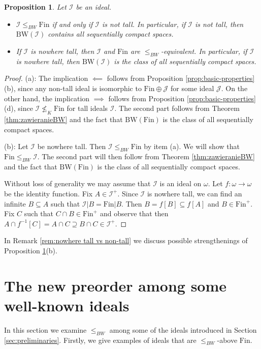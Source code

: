 \documentclass{amsart}
\theoremstyle{plain}
\newtheorem{proposition}[theorem]{Proposition}
\theoremstyle{definition}
\theoremstyle{remark}
\newcommand{\cI}{\mathcal{I}}
\newcommand{\I}{\cI}
\newcommand{\cJ}{\mathcal{J}}
\newcommand{\J}{\cJ}
\newcommand{\fin}{\mathrm{Fin}}
\newcommand{\Fin}{\mathrm{Fin}}
\newcommand{\BW}{\mathrm{BW}}
\begin{document}
\begin{proposition}
\label{prop:Fin_vs_tall}
Let $\I$ be an ideal.
\begin{itemize}
    \item[(a)] $\I\leq_{BW}\Fin$ if and only if $\I$ is not tall. In particular, if $\I$ is not tall, then $\BW(\I)$ contains all sequentially compact spaces. 
    \item[(b)] If $\I$ is nowhere tall, then $\I$ and $\Fin$ are $\leq_{BW}$-equivalent. In particular, if $\I$ is nowhere tall, then $\BW(\I)$ is the class of all sequentially compact spaces.
\end{itemize}
\end{proposition}

\begin{proof}
(a): The implication $\impliedby$ follows from Proposition \ref{prop:basic-properties}(b), since any non-tall ideal is isomorphic to $\Fin\oplus\J$ for some ideal $\J$. On the other hand, the implication $\implies$ follows from Proposition \ref{prop:basic-properties}(d), since $\I\not\leq_K\Fin$ for tall ideals $\I$. The second part follows from Theorem \ref{thm:zawieranieBW} and the fact that $\BW(\Fin)$ is the class of all sequentially compact spaces.

(b): Let $\I$ be nowhere tall. Then $\I\leq_{BW}\Fin$ by item (a). We will show that $\Fin\leq_{BW}\I$. The second part will then follow from Theorem \ref{thm:zawieranieBW} and the fact that $\BW(\Fin)$ is the class of all sequentially compact spaces.

Without loss of generality we may assume that $\I$ is an ideal on $\omega$. Let $f:\omega \to \omega$ be the identity function. Fix $A \in \I^+$. Since $\I$ is nowhere tall, we can find an infinite $B\subseteq A$ such that $\I|B=\Fin|B$. Then $B = f[B]\subseteq f[A]$ and $B \in \fin^+$. Fix $C$ such that $C\cap B \in \fin^+$ and observe that then $A \cap f^{-1}[C]=A \cap C \supseteq B\cap C\in \I^+$.
\end{proof}

In Remark \ref{rem:nowhere tall vs non-tall} we discuss possible strengthenings of Proposition \ref{prop:Fin_vs_tall}(b).



\section{The new preorder among some well-known ideals}
\label{sec:porownania}

In this section we examine $\leq_{BW}$ among some of the ideals introduced in Section \ref{sec:preliminaries}. Firstly, we give examples of ideals that are $\leq_{BW}$-above $\Fin$.
\end{document}

